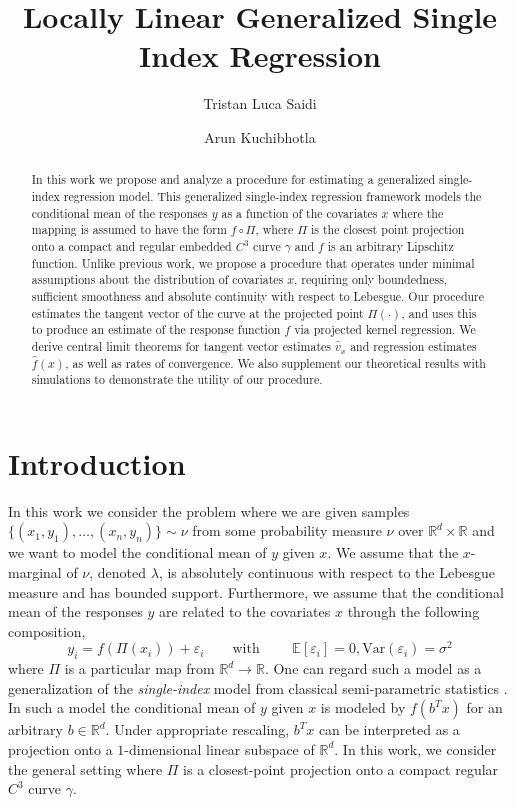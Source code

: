\documentclass[11pt]{article}
\title{Locally Linear Generalized Single Index Regression}
\author{Tristan Luca Saidi}
\author{Arun Kuchibhotla}
\affil[1]{Department of Statistics and Data Science, Carnegie Mellon University}
\begin{document}
\maketitle

\begin{abstract}
    In this work we propose and analyze a procedure for estimating a generalized single-index regression model. This generalized single-index regression framework models the conditional mean of the responses $y$ as a function of the covariates $x$ where the mapping is assumed to have the form $f \circ \Pi$, where $\Pi$ is the closest point projection onto a compact and regular embedded $C^3$ curve $\gamma$ and $f$ is an arbitrary Lipschitz function. Unlike previous work, we propose a procedure that operates under minimal assumptions about the distribution of covariates $x$, requiring only boundedness, sufficient smoothness and absolute continuity with respect to Lebesgue. Our procedure estimates the tangent vector of the curve at the projected point $\Pi(\cdot )$, and uses this to produce an estimate of the response function $f$ via projected kernel regression. We derive central limit theorems for tangent vector estimates $\hat{v}_x$ and regression estimates $\hat{f}(x)$, as well as rates of convergence. We also supplement our theoretical results with simulations to demonstrate the utility of our procedure.   
\end{abstract}

\section{Introduction}

In this work we consider the problem where we are given samples $\{(x_1, y_1), \dots, (x_n, y_n)\} \sim \nu$ from some probability measure $\nu$ over $\mathbb{R}^d\times \mathbb{R}$ and we want to model the conditional mean of $y$ given $x$. We assume that the $x$-marginal of $\nu$, denoted $\lambda$, is absolutely continuous with respect to the Lebesgue measure and has bounded support. Furthermore, we assume that the conditional mean of the responses $y$ are related to the covariates $x$ through the following composition,
\begin{equation}
    y_i = f(\Pi(x_i)) + \varepsilon_i \qquad \text{with } \qquad \mathbb{E}[\varepsilon_i] = 0, \text{Var}(\varepsilon_i) = \sigma^2 \label{eq: the model}
\end{equation}
where $\Pi$ is a particular map from $\mathbb{R}^d \rightarrow \mathbb{R}$. One can regard such a model as a generalization of the \textit{single-index} model from classical semi-parametric statistics \cite{gyorfi2002distribution}. In such a model the conditional mean of $y$ given $x$ is modeled by $f(b^Tx)$ for an arbitrary $b\in \mathbb{R}^d$. Under appropriate rescaling, $b^Tx$ can be interpreted as a projection onto a $1$-dimensional linear subspace of $\mathbb{R}^d$. In this work, we consider the general setting where $\Pi$ is a closest-point projection onto a compact regular $C^3$ curve $\gamma$.
\end{document}
